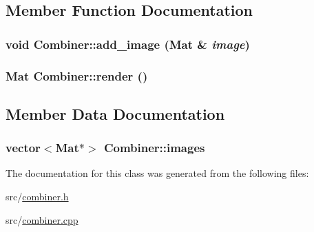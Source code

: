 \subsection{Member Function Documentation}
\hypertarget{class_combiner_a40ddc10da1134e1e003cf6ddf46da8b9}{
\subsubsection[{add\_\-image}]{\setlength{\rightskip}{0pt plus 5cm}void Combiner::add\_\-image (Mat \& {\em image})}}
\label{class_combiner_a40ddc10da1134e1e003cf6ddf46da8b9}
\hypertarget{class_combiner_aee8b8d179fbdccb013abf4b244d51e7e}{
\subsubsection[{render}]{\setlength{\rightskip}{0pt plus 5cm}Mat Combiner::render ()}}
\label{class_combiner_aee8b8d179fbdccb013abf4b244d51e7e}


\subsection{Member Data Documentation}
\hypertarget{class_combiner_abe68e0620c00e937b066a11ed3ce51dc}{
\subsubsection[{images}]{\setlength{\rightskip}{0pt plus 5cm}vector$<$Mat$\ast$$>$ {\bf Combiner::images}}}
\label{class_combiner_abe68e0620c00e937b066a11ed3ce51dc}


The documentation for this class was generated from the following files:\begin{DoxyCompactItemize}
\item 
src/\hyperlink{combiner_8h}{combiner.h}\item 
src/\hyperlink{combiner_8cpp}{combiner.cpp}\end{DoxyCompactItemize}
